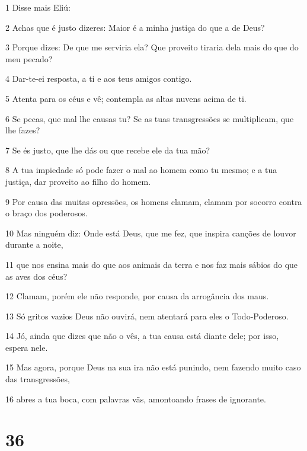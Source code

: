 \par 1 Disse mais Eliú:
\par 2 Achas que é justo dizeres: Maior é a minha justiça do que a de Deus?
\par 3 Porque dizes: De que me serviria ela? Que proveito tiraria dela mais do que do meu pecado?
\par 4 Dar-te-ei resposta, a ti e aos teus amigos contigo.
\par 5 Atenta para os céus e vê; contempla as altas nuvens acima de ti.
\par 6 Se pecas, que mal lhe causas tu? Se as tuas transgressões se multiplicam, que lhe fazes?
\par 7 Se és justo, que lhe dás ou que recebe ele da tua mão?
\par 8 A tua impiedade só pode fazer o mal ao homem como tu mesmo; e a tua justiça, dar proveito ao filho do homem.
\par 9 Por causa das muitas opressões, os homens clamam, clamam por socorro contra o braço dos poderosos.
\par 10 Mas ninguém diz: Onde está Deus, que me fez, que inspira canções de louvor durante a noite,
\par 11 que nos ensina mais do que aos animais da terra e nos faz mais sábios do que as aves dos céus?
\par 12 Clamam, porém ele não responde, por causa da arrogância dos maus.
\par 13 Só gritos vazios Deus não ouvirá, nem atentará para eles o Todo-Poderoso.
\par 14 Jó, ainda que dizes que não o vês, a tua causa está diante dele; por isso, espera nele.
\par 15 Mas agora, porque Deus na sua ira não está punindo, nem fazendo muito caso das transgressões,
\par 16 abres a tua boca, com palavras vãs, amontoando frases de ignorante.

\chapter{36}

